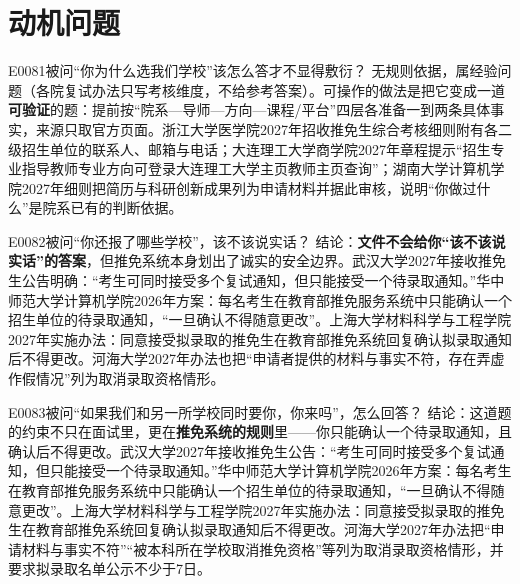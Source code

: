 \section{动机问题}
\begin{qa}{E0081}{被问“你为什么选我们学校”该怎么答才不显得敷衍？}
无规则依据，属经验问题（各院复试办法只写考核维度，不给参考答案）。可操作的做法是把它变成一道\textbf{可验证}的题：提前按“院系—导师—方向—课程/平台”四层各准备一到两条具体事实，来源只取官方页面。浙江大学医学院2027年招收推免生综合考核细则附有各二级招生单位的联系人、邮箱与电话；大连理工大学商学院2027年章程提示“招生专业指导教师专业方向可登录大连理工大学主页教师主页查询”；湖南大学计算机学院2027年细则把简历与科研创新成果列为申请材料并据此审核，说明“你做过什么”是院系已有的判断依据。
\end{qa}

\begin{qa}{E0082}{被问“你还报了哪些学校”，该不该说实话？}
结论：\textbf{文件不会给你“该不该说实话”的答案}，但推免系统本身划出了诚实的安全边界。武汉大学2027年接收推免生公告明确：“考生可同时接受多个复试通知，但只能接受一个待录取通知。”华中师范大学计算机学院2026年方案：每名考生在教育部推免服务系统中只能确认一个招生单位的待录取通知，“一旦确认不得随意更改”。上海大学材料科学与工程学院2027年实施办法：同意接受拟录取的推免生在教育部推免系统回复确认拟录取通知后不得更改。河海大学2027年办法也把“申请者提供的材料与事实不符，存在弄虚作假情况”列为取消录取资格情形。
\end{qa}

\begin{qa}{E0083}{被问“如果我们和另一所学校同时要你，你来吗”，怎么回答？}
结论：这道题的约束不只在面试里，更在\textbf{推免系统的规则}里——你只能确认一个待录取通知，且确认后不得更改。武汉大学2027年接收推免生公告：“考生可同时接受多个复试通知，但只能接受一个待录取通知。”华中师范大学计算机学院2026年方案：每名考生在教育部推免服务系统中只能确认一个招生单位的待录取通知，“一旦确认不得随意更改”。上海大学材料科学与工程学院2027年实施办法：同意接受拟录取的推免生在教育部推免系统回复确认拟录取通知后不得更改。河海大学2027年办法把“申请材料与事实不符”“被本科所在学校取消推免资格”等列为取消录取资格情形，并要求拟录取名单公示不少于7日。
\end{qa}

